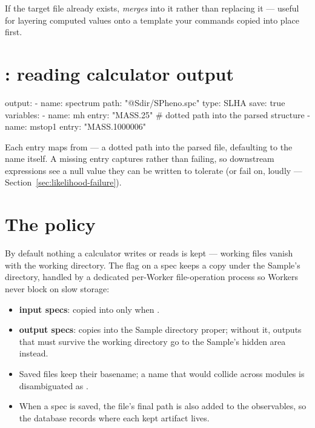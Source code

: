 If the target file already exists,  \emph{merges} into it rather than
replacing it --- useful for layering computed values onto a template your commands
copied into place first.

\section{: reading calculator output}
\label{sec:output-spec}

\begin{yamlwin}
output:
  - name: spectrum
    path: "@Sdir/SPheno.spc"
    type: SLHA
    save: true
    variables:
      - name: mh
        entry: "MASS.25"          # dotted path into the parsed structure
      - name: mstop1
        entry: "MASS.1000006"
\end{yamlwin}

Each  entry maps  from  --- a dotted
path into the parsed file, defaulting to the name itself. A missing entry captures
 rather than failing, so downstream expressions see a null value they can be
written to tolerate (or fail on, loudly --- Section~\ref{sec:likelihood-failure}).

\section{The  policy}
\label{sec:save-policy}

By default nothing a calculator writes or reads is kept --- working files vanish with
the working directory. The  flag on a spec keeps a copy under the Sample's
directory, handled by a dedicated per-Worker file-operation process so Workers never
block on slow storage:

\begin{itemize}
  \item \textbf{input specs}: copied into  only when
        .
  \item \textbf{output specs}:  copies into the Sample directory
        proper; without it, outputs that must survive the working directory go to the
        Sample's hidden  area instead.
  \item Saved files keep their basename; a name that would collide across modules is
        disambiguated as .
  \item When a spec is saved, the file's final path is also added to the observables,
        so the database records where each kept artifact lives.
\end{itemize}

